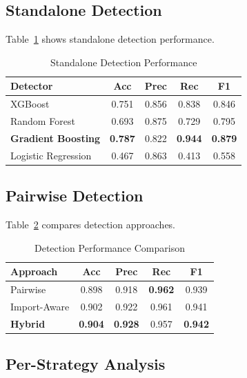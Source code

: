 \documentclass[conference]{IEEEtran}
\begin{document}
\subsection{Standalone Detection}

Table~\ref{tab:standalone} shows standalone detection performance.

\begin{table}[h]
\centering
\caption{Standalone Detection Performance}
\label{tab:standalone}
\begin{tabular}{@{}lcccc@{}}
\toprule
\textbf{Detector} & \textbf{Acc} & \textbf{Prec} & \textbf{Rec} & \textbf{F1} \\
\midrule
XGBoost & 0.751 & 0.856 & 0.838 & 0.846 \\
Random Forest & 0.693 & 0.875 & 0.729 & 0.795 \\
\textbf{Gradient Boosting} & \textbf{0.787} & 0.822 & \textbf{0.944} & \textbf{0.879} \\
Logistic Regression & 0.467 & 0.863 & 0.413 & 0.558 \\
\bottomrule
\end{tabular}
\end{table}

\subsection{Pairwise Detection}

Table~\ref{tab:performance} compares detection approaches.

\begin{table}[h]
\centering
\caption{Detection Performance Comparison}
\label{tab:performance}
\begin{tabular}{@{}lcccc@{}}
\toprule
\textbf{Approach} & \textbf{Acc} & \textbf{Prec} & \textbf{Rec} & \textbf{F1} \\
\midrule
Pairwise & 0.898 & 0.918 & \textbf{0.962} & 0.939 \\
Import-Aware & 0.902 & 0.922 & 0.961 & 0.941 \\
\textbf{Hybrid} & \textbf{0.904} & \textbf{0.928} & 0.957 & \textbf{0.942} \\
\bottomrule
\end{tabular}
\end{table}

\subsection{Per-Strategy Analysis}
\end{document}
